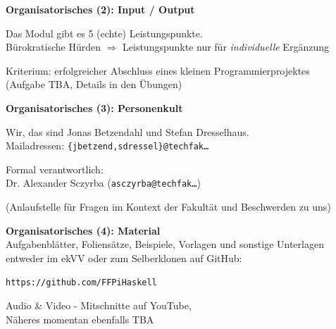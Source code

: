 \documentclass[unknownkeysallowed]{beamer}
\begin{document}
  
  \begin{frame}
    \begin{center}
    \Large\textbf{Organisatorisches (2): Input / Output}\\ \bigskip\bigskip \normalsize
    
    Das Modul gibt es 5 (echte) Leistungspunkte.\\
    Bürokratische Hürden $\Rightarrow$ Leistungspunkte nur für \emph{individuelle} Ergänzung \bigskip
    
    Kriterium: erfolgreicher Abschluss eines kleinen Programmierprojektes\\
    (Aufgabe TBA, Details in den Übungen)
    \end{center}
  \end{frame}
  
  
  \begin{frame}
    \begin{center}
    \Large\textbf{Organisatorisches (3): Personenkult}\\ \bigskip\bigskip \normalsize

	Wir, das sind Jonas Betzendahl und Stefan Dresselhaus.\\
	Mailadressen: \texttt{\{jbetzend,sdressel\}@techfak\dots}\\ \bigskip
    
    Formal verantwortlich:\\Dr. Alexander Sczyrba (\texttt{asczyrba@techfak\dots})\bigskip
    
    (Anlaufstelle für Fragen im Kontext der Fakultät und Beschwerden zu uns)
    \end{center}
  \end{frame}
  
  
  \begin{frame}
    \begin{center}
	\Large\textbf{Organisatorisches (4): Material}\\ \bigskip\bigskip \normalsize
	Aufgabenblätter, Foliensätze, Beispiele, Vorlagen und sonstige Unterlagen entweder im ekVV oder zum Selberklonen auf GitHub:
	
	\bigskip\texttt{https://github.com/FFPiHaskell}\bigskip
	
	Audio \& Video - Mitschnitte auf YouTube, \\Näheres momentan ebenfalls TBA
    \end{center}
  \end{frame}
  
\end{document}
